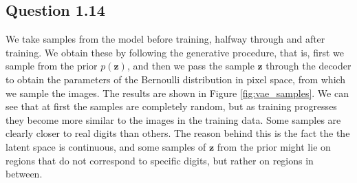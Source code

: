 \documentclass{article}
\begin{document}
\subsection*{Question 1.14}

We take samples from the model before training, halfway through and after training. We obtain these by following the generative procedure, that is, first we sample from the prior $p(\mathbf{z})$, and then we pass the sample $\mathbf{z}$ through the decoder to obtain the parameters of the Bernoulli distribution in pixel space, from which we sample the images. The results are shown in Figure \ref{fig:vae_samples}. We can see that at first the samples are completely random, but as training progresses they become more similar to the images in the training data. Some samples are clearly closer to real digits than others. The reason behind this is the fact the the latent space is continuous, and some samples of $\mathbf{z}$ from the prior might lie on regions that do not correspond to specific digits, but rather on regions in between.
\end{document}

